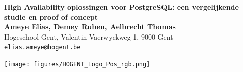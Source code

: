 \documentclass[a0,portrait]{a0poster}
\begin{document}


\begin{minipage}[t]{0.75\linewidth}
\VeryHuge \color{HoGentAccent1} \textbf{High Availability oplossingen voor PostgreSQL: een vergelijkende studie en proof of concept} \color{Black}\\ %
\huge \textbf{Ameye Elias, Demey Ruben, Aelbrecht Thomas}\\[0.5cm] %
\huge Hogeschool Gent, Valentin Vaerwyckweg 1, 9000 Gent\\[0.4cm] %
\Large \texttt{elias.ameye@hogent.be} \\
\end{minipage}
%
\begin{minipage}[t]{0.25\linewidth}
\texttt{[image: figures/HOGENT\_Logo\_Pos\_rgb.png]} 

\end{minipage}

\vspace{1cm} %

\end{document}

